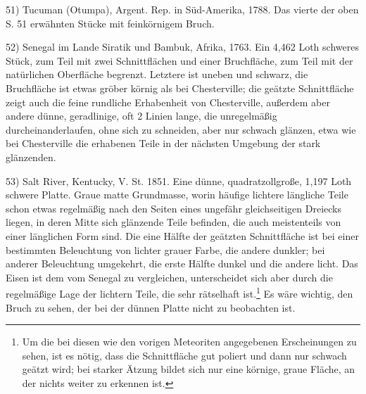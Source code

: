 \documentclass[a4paper, 11pt, oneside]{article}
\begin{document}
51) Tucuman (Otumpa), Argent. Rep. in Süd-Amerika, 1788. Das vierte der oben S. 51 erwähnten Stücke mit feinkörnigem Bruch.

52) Senegal im Lande Siratik und Bambuk, Afrika, 1763. Ein 4,462 Loth schweres Stück, zum Teil mit zwei Schnittflächen und einer Bruchfläche, zum Teil mit der natürlichen Oberfläche begrenzt. Letztere ist uneben und schwarz, die Bruchfläche ist etwas gröber körnig als bei Chesterville; die geätzte Schnittfläche zeigt auch die feine rundliche Erhabenheit von Chesterville, außerdem aber andere dünne, geradlinige, oft 2 Linien lange, die unregelmäßig durcheinanderlaufen, ohne sich zu schneiden, aber nur schwach glänzen, etwa wie bei Chesterville die erhabenen Teile in der nächsten Umgebung der stark glänzenden.

53) Salt River, Kentucky, V. St. 1851. Eine dünne, quadratzollgroße, 1,197 Loth schwere Platte. Graue matte Grundmasse, worin häufige lichtere längliche Teile schon etwas regelmäßig nach den Seiten eines ungefähr gleichseitigen Dreiecks liegen, in deren Mitte sich glänzende Teile befinden, die auch meistenteils von einer länglichen Form sind. Die eine Hälfte der geätzten Schnittfläche ist bei einer bestimmten Beleuchtung von lichter grauer Farbe, die andere dunkler; bei anderer Beleuchtung umgekehrt, die erste Hälfte dunkel und die andere licht. Das Eisen ist dem vom Senegal zu vergleichen, unterscheidet sich aber durch die regelmäßige Lage der lichtern Teile, die sehr rätselhaft ist.\footnote{Um die bei diesen wie den vorigen Meteoriten angegebenen Erscheinungen zu sehen, ist es nötig, dass die Schnittfläche gut poliert und dann nur schwach geätzt wird; bei starker Ätzung bildet sich nur eine körnige, graue Fläche, an der nichts weiter zu erkennen ist.} Es wäre wichtig, den Bruch zu sehen, der bei der dünnen Platte nicht zu beobachten ist.
\end{document}
